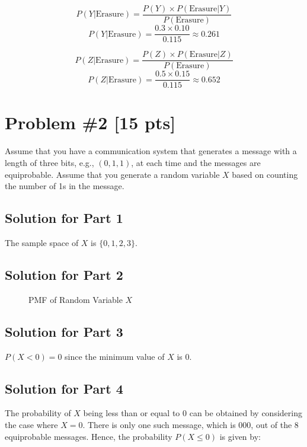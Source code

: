\documentclass{article}
\begin{document}
\[
P(Y | \text{Erasure}) = \frac{P(Y) \times P(\text{Erasure} | Y)}{P(\text{Erasure})}
\]
\[
P(Y | \text{Erasure}) = \frac{0.3 \times 0.10}{0.115} \approx 0.261
\]

\[
P(Z | \text{Erasure}) = \frac{P(Z) \times P(\text{Erasure} | Z)}{P(\text{Erasure})}
\]
\[
P(Z | \text{Erasure}) = \frac{0.5 \times 0.15}{0.115} \approx 0.652
\]

\newpage
\section*{Problem \#2 [15 pts]}
Assume that you have a communication system that generates a message with a length of three bits, e.g., \((0,1,1)\), at each time and the messages are equiprobable. Assume that you generate a random variable \(X\) based on counting the number of 1s in the message.

\subsection*{Solution for Part 1}
The sample space of \(X\) is \(\{0, 1, 2, 3\}\).

\subsection*{Solution for Part 2}
\begin{figure}[h!]
  \centering
  \caption{PMF of Random Variable \(X\)}
\end{figure}


\subsection*{Solution for Part 3}
\(P(X < 0) = 0\) since the minimum value of \(X\) is 0.

\subsection*{Solution for Part 4}
The probability of \(X\) being less than or equal to 0 can be obtained by considering the case where \(X=0\). There is only one such message, which is \(000\), out of the 8 equiprobable messages. Hence, the probability \(P(X \leq 0)\) is given by:
\end{document}
